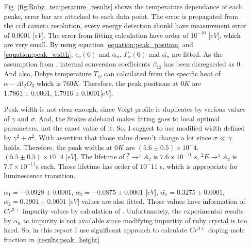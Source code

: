 \documentclass{article}
\begin{document}
Fig. \ref{fig:Ruby_temperature_results} shows the temperature dependance of each peaks, error bar are attached to each data point.
The error is propagated from the ccd camera resolution, every energy detection should have measurement error of $0.0001$ [$eV$].
The error from fitting calculation have order of $10^{-10}$ [$eV$], which are very small.
By using equation \ref{equation:peak_position} and \ref{equation:peak_width}, $\epsilon_n(0)$ and $\alpha_n$, $\Gamma_n(0)$ and $\bar{\alpha_n}$ are fitted.
As the assumption from \cite{Ruby_temp_theoretical}, internal conversion coefficients $\beta_{12}$ has been disregarded as 0.
And also, Debye temperature $T_D$ can calculated from the specific heat of $\alpha-Al_2 O_3 $ which is $760 K$.
Therefore, the peak positions at 0$K$ are $1.7861 \pm 0.0001$, $1.7916 \pm 0.0001$[$eV$].


Peak width is not clear enough, since Voigt profile is duplicates by various values of $\gamma$ and $\sigma$.
And, the Stokes sideband makes fitting goes to local optimal parameters, not the exact value of it.
So, I suggest to use modified width defined by $\gamma^2 + \sigma^2$.
With assertion that those value doesn't change a lot since $\sigma \ll \gamma$ holds.
Therefore, the peak widths at 0$K$ are $(5.6 \pm 0.5)\times 10^-4$, $(5.5 \pm 0.5)\times 10^-4$ [$eV$].
The lifetime of $^T_1 \rightarrow ^4A_2$ is $7.6 \times 10^{-11}$ s, $ ^2E \rightarrow ^4A_2$ is $7.7 \times 10^{-11}$s each.
Those lifetime has order of $10^-{11}$ s, which is appropriate for luminescence transition.

$\alpha_1 = -0.0928 \pm 0.0001$, $\alpha_2 = -0.0875 \pm 0.0001$ [$eV$], $\bar{\alpha_1} = 0.3275 \pm 0.0001$, $\bar{\alpha_2} = 0.1901 \pm 0.0001$ [$eV$] values are also fitted.
Those values have information of $Cr^{3+}$ impurity values by calculation of \cite{fitting_coef_impurity}.
Unfortunately, the experimental results by $\alpha_n$ to impurity is not available since modifying impuritiy of ruby crystal is too hard.
So, in this report I use significant approach to calculate $Cr^{3+}$ doping mole fraction in \ref{results:peak_height}
\end{document}

